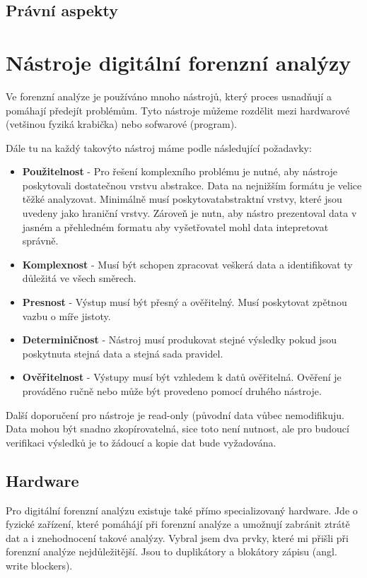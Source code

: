 \documentclass[thesis=B,czech]{FITthesis}[2012/06/26]
\begin{document}
\section{Právní aspekty}
\cite{svetlik2010digitalni}

\chapter{Nástroje digitální forenzní analýzy} 
\label{body}
Ve forenzní analýze je používáno mnoho nástrojů, který proces usnadňují a pomáhají předejít problémům. Tyto nástroje můžeme rozdělit mezi hardwarové (vetšinou fyziká krabička) nebo sofwarové (program).

Dále tu na každý takovýto nástroj máme podle \cite{for_need} následující požadavky:

\begin{itemize}
\item \textbf{Použitelnost} - Pro řešení komplexního problému je nutné, aby nástroje poskytovali dostatečnou vrstvu abstrakce. Data na nejnižším formátu je velice těžké analyzovat. Minimálně musí poskytovatabstraktní vrstvy, které jsou uvedeny jako hraniční vrstvy. Zároveň je nutn, aby nástro prezentoval data v jasném a přehledném formatu aby vyšetřovatel mohl data intepretovat správně. \cite{carrier2003defining}
\item \textbf{Komplexnost} - Musí být schopen zpracovat veškerá data a identifikovat ty důležitá ve všech směrech.
\item \textbf{Presnost} - Výstup musí být přesný a ověřitelný. Musí poskytovat zpětnou vazbu o míře jistoty.
\item \textbf{Determiničnost} - Nástroj musí produkovat stejné výsledky pokud jsou poskytnuta stejná data a stejná sada pravidel.
\item \textbf{Ověřitelnost} - Výstupy musí být vzhledem k datů ověřitelná. Ověření je prováděno ručně nebo může být provedeno pomocí druhého nástroje.
\end{itemize}

Další doporučení pro nástroje je read-only (původní data vůbec nemodifikuju. Data mohou být snadno zkopírovatelná, sice toto není nutnost, ale pro budoucí verifikaci výsledků je to žádoucí a kopie dat bude vyžadována. 


\section{Hardware}
Pro digitální forenzní analýzu existuje také přímo specializovaný hardware. Jde o fyzické zařízení, které pomáhájí při forenzní analýze a umožnují zabránit ztrátě dat a i znehodnocení takové analýzy. Vybral jsem dva prvky, které mi přišli při forenzní analýze nejdůležitější. Jsou to duplikátory a blokátory zápisu (angl. write blockers).
\end{document}
